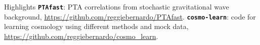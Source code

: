 \begin{rubric}{Highlights}
\entry*[Software]%
\texttt{\textbf{PTAfast}}: PTA correlations from stochastic gravitational wave background, \href{https://github.com/reggiebernardo/PTAfast}{https://github.com/reggiebernardo/PTAfast}.
\entry*[Software]%
\texttt{\textbf{cosmo-learn}}: code for learning cosmology using different methods and mock data, \href{https://github.com/reggiebernardo/cosmo_learn}{https://github.com/reggiebernardo/cosmo\_learn}.
\entry*[Papers]%
\entry*[]%
\entry*[Review]%
\end{rubric}